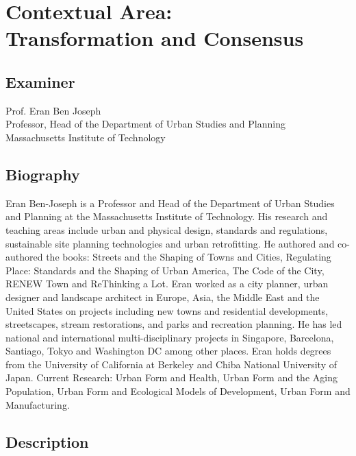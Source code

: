 \section*{Contextual Area:\\Transformation and Consensus}
% 
\subsection*{Examiner}
Prof. Eran Ben Joseph\\
Professor, Head of the Department of Urban Studies and Planning\\
Massachusetts Institute of Technology
% 
\subsection*{Biography}
Eran Ben-Joseph is a Professor and Head of the Department of Urban Studies and Planning at the Massachusetts Institute of Technology. His research and teaching areas include urban and physical design, standards and regulations, sustainable site planning technologies and urban retrofitting. He authored and co-authored the books: Streets and the Shaping of Towns and Cities, Regulating Place: Standards and the Shaping of Urban America, The Code of the City, RENEW Town and ReThinking a Lot. Eran worked as a city planner, urban designer and landscape architect in Europe, Asia, the Middle East and the United States on projects including new towns and residential developments, streetscapes, stream restorations, and parks and recreation planning. He has led national and international multi-disciplinary projects in Singapore, Barcelona, Santiago, Tokyo and Washington DC among other places. Eran holds degrees from the University of California at Berkeley and Chiba National University of Japan. Current Research: Urban Form and Health, Urban Form and the Aging Population, Urban Form and Ecological Models of Development, Urban Form and Manufacturing.
% 
\subsection*{Description}

